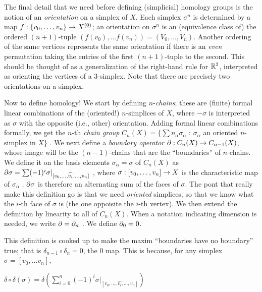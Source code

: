 \msk

The final detail that we need before defining (simplicial) homology
groups is the notion of an {\it orientation} on a simplex of $X$.
Each simplex $\sigma^n$ is determined by a map 
$f:\{v_0,\ldots ,v_n\}\rightarrow X^{(0)}$; an orientation on $\sigma^n$ is an
(equivalence class of) the ordered $(n+1)$-tuple $(f(v_0),\ldots f(v_n)) = (V_0,\ldots ,V_n)$.
Another ordering of the
same vertices represents the same orientation if there is an {\it even} permutation
taking the entries of the first $(n+1)$-tuple to the second. This should be thought 
of as a generalization of the right-hand rule for ${\Bbb R}^3$, interpreted as
orienting the vertices of a 3-simplex. Note that there are precisely two
orientations on a simplex.

\msk

Now to define homology! We start by defining $n$-{\it chains};
these are (finite) formal linear combinations of the (oriented!) $n$-simplices
of $X$, where $-\sigma$ is interpreted as $\sigma$ with the opposite
(i.e., other) orientation. Adding formal linear combinations formally,
we get the $n$-th {\it chain group} 
$C_n(X) = \{\sum n_\alpha \sigma_\alpha$ : $\sigma_\alpha$ an oriented $n$-simplex in $X\}$ .
We next define a {\it boundary operator} $\partial:C_n(X)\rightarrow C_{n-1}(X)$, whose image will be 
the $(n-1)$-chains that are the ``boundaries'' of $n$-chains. We define it on the basis
elements $\sigma_\alpha = \sigma$ of $C_n(X)$ as
$\partial\sigma = \sum (-1)^i\sigma|_{[v_0,\ldots,\widehat{v_{i}},\ldots ,v_n]}$ , 
where $\sigma:[v_0,\ldots ,v_n]\rightarrow X$ is the characteristic map of $\sigma_\alpha$ .
$\partial\sigma$ is therefore an alternating sum of the faces of $\sigma$. 
The pont that really make this definition
go is that we need {\it oriented} simplices, so that we know what the $i$-th face
of $\sigma$ is (the one oppoisite the $i$-th vertex).
We then extend the definition by linearity to all of $C_n(X)$. When a notation indicating
dimension is needed, we write $\partial=\partial_n$ . We define $\partial_0=0$.

\msk

This definition is cooked up to make the maxim ``boundaries have no boundary'' true;
that is $\delta_{n-1}\circ \delta_n = 0$, the $0$ map. This is because, for any simplex
$\sigma = [v_0,\ldots v_n]$, 

\msk

$\displaystyle \delta\circ\delta(\sigma) = 
\delta(\sum_{i=0}^n  (-1)^i\sigma|_{[v_0,\ldots,\widehat{v_{i}},\ldots ,v_n]})$

